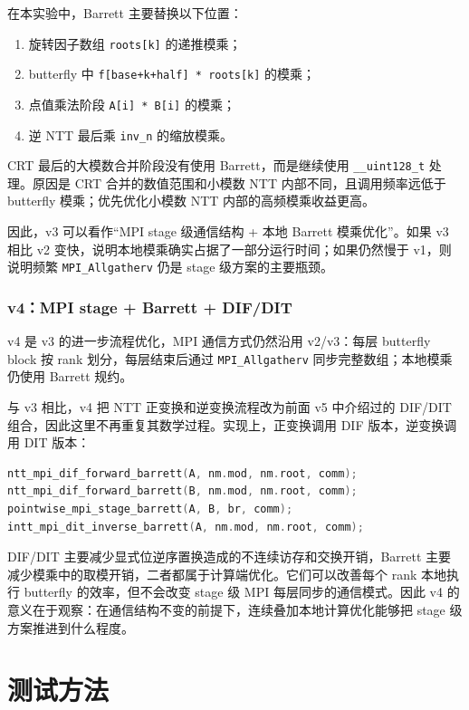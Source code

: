 \documentclass[a4paper]{article}
\begin{document}
在本实验中，Barrett 主要替换以下位置：
\begin{enumerate}
    \item 旋转因子数组 \texttt{roots[k]} 的递推模乘；
    \item butterfly 中 \texttt{f[base+k+half] * roots[k]} 的模乘；
    \item 点值乘法阶段 \texttt{A[i] * B[i]} 的模乘；
    \item 逆 NTT 最后乘 \texttt{inv\_n} 的缩放模乘。
\end{enumerate}

CRT 最后的大模数合并阶段没有使用 Barrett，而是继续使用 \texttt{\_\_uint128\_t} 处理。原因是 CRT 合并的数值范围和小模数 NTT 内部不同，且调用频率远低于 butterfly 模乘；优先优化小模数 NTT 内部的高频模乘收益更高。

因此，v3 可以看作“MPI stage 级通信结构 + 本地 Barrett 模乘优化”。如果 v3 相比 v2 变快，说明本地模乘确实占据了一部分运行时间；如果仍然慢于 v1，则说明频繁 \texttt{MPI\_Allgatherv} 仍是 stage 级方案的主要瓶颈。

\subsubsection{v4：MPI stage + Barrett + DIF/DIT}

v4 是 v3 的进一步流程优化，MPI 通信方式仍然沿用 v2/v3：每层 butterfly block 按 rank 划分，每层结束后通过 \texttt{MPI\_Allgatherv} 同步完整数组；本地模乘仍使用 Barrett 规约。

与 v3 相比，v4 把 NTT 正变换和逆变换流程改为前面 v5 中介绍过的 DIF/DIT 组合，因此这里不再重复其数学过程。实现上，正变换调用 DIF 版本，逆变换调用 DIT 版本：
\begin{lstlisting}[language=C++,title=v4 的 stage + Barrett + DIF/DIT 主流程]
ntt_mpi_dif_forward_barrett(A, nm.mod, nm.root, comm);
ntt_mpi_dif_forward_barrett(B, nm.mod, nm.root, comm);
pointwise_mpi_stage_barrett(A, B, br, comm);
intt_mpi_dit_inverse_barrett(A, nm.mod, nm.root, comm);
\end{lstlisting}

DIF/DIT 主要减少显式位逆序置换造成的不连续访存和交换开销，Barrett 主要减少模乘中的取模开销，二者都属于计算端优化。它们可以改善每个 rank 本地执行 butterfly 的效率，但不会改变 stage 级 MPI 每层同步的通信模式。因此 v4 的意义在于观察：在通信结构不变的前提下，连续叠加本地计算优化能够把 stage 级方案推进到什么程度。

\section{测试方法}
\end{document}
